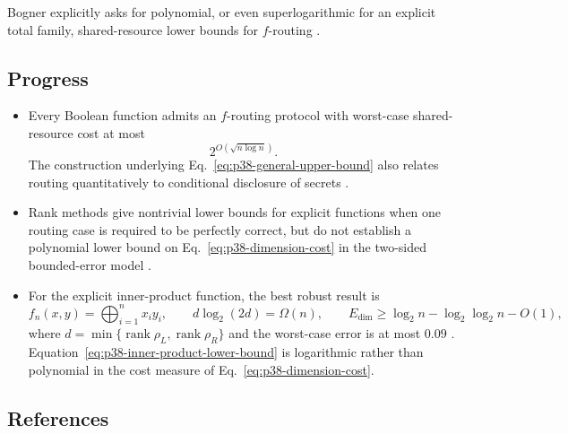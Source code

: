 Bogner explicitly asks for polynomial, or even superlogarithmic for an
explicit total family, shared-resource lower bounds for $f$-routing
.

\subsection*{Progress}

\begin{itemize}
  \item Every Boolean function admits an $f$-routing protocol with worst-case
  shared-resource cost at most
  \begin{equation}
    2^{O(\sqrt{n\log n})}.
    \label{eq:p38-general-upper-bound}
  \end{equation}
  The construction underlying Eq.~\eqref{eq:p38-general-upper-bound} also
  relates routing quantitatively to conditional disclosure of secrets
  .

  \item Rank methods give nontrivial lower bounds for explicit functions when
  one routing case is required to be perfectly correct, but do not establish
  a polynomial lower bound on Eq.~\eqref{eq:p38-dimension-cost} in the
  two-sided bounded-error model .

  \item For the explicit inner-product function, the best robust result is
  \begin{equation}
    f_n(x,y)=\bigoplus_{i=1}^n x_i y_i,
    \qquad
    d\log_2(2d)=\Omega(n),
    \qquad
    E_{\mathrm{dim}}\geq
      \log_2n-\log_2\log_2n-O(1),
    \label{eq:p38-inner-product-lower-bound}
  \end{equation}
  where $d=\min\{\operatorname{rank}\rho_L,
  \operatorname{rank}\rho_R\}$ and the worst-case error is at most $0.09$
  .
  Equation~\eqref{eq:p38-inner-product-lower-bound} is logarithmic rather than
  polynomial in the cost measure of Eq.~\eqref{eq:p38-dimension-cost}.
\end{itemize}

\subsection*{References}

